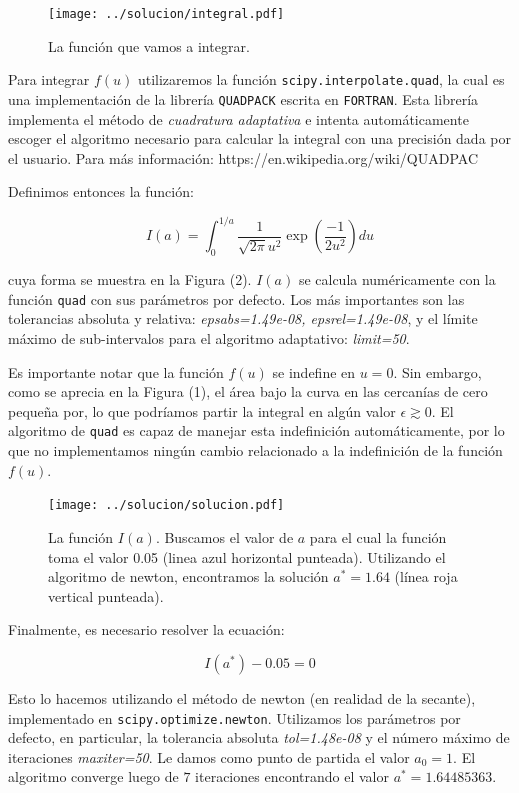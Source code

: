 \documentclass[letter, 11pt]{article}
\begin{document}
\begin{figure}[!ht]
  \centering
  \texttt{[image: ../solucion/integral.pdf]}
  \caption{La función que vamos a integrar.}
\end{figure}

Para integrar $f(u)$ utilizaremos la función \texttt{scipy.interpolate.quad},
la cual es una implementación de la librería \texttt{QUADPACK} escrita en
\texttt{FORTRAN}. Esta librería implementa el método de {\it cuadratura
adaptativa} e intenta automáticamente escoger el algoritmo necesario para
calcular la integral con una precisión dada por el usuario. Para más
información: https://en.wikipedia.org/wiki/QUADPAC

Definimos entonces la función:

\begin{equation}
  I(a) =  \int_0^{1/a} \frac{1}{\sqrt{2\pi}u^2} \exp\left({\frac{-1}{2u^2}}\right) du
\end{equation}

cuya forma se muestra en la Figura (2). $I(a)$ se calcula numéricamente con la
función \texttt{quad} con sus parámetros por defecto. Los más importantes son
las tolerancias absoluta y relativa: {\it epsabs=1.49e-08, epsrel=1.49e-08}, y
el límite máximo de sub-intervalos para el algoritmo adaptativo: {\it
limit=50}.

Es importante notar que la función $f(u)$ se indefine en $u=0$. Sin embargo,
como se aprecia en la Figura (1), el área bajo la curva en las cercanías de
cero pequeña por, lo que podríamos partir la integral en algún valor $\epsilon
\gtrsim 0$. El algoritmo de \texttt{quad} es capaz de manejar esta indefinición
automáticamente, por lo que no implementamos ningún cambio relacionado a la
indefinición de la función $f(u)$.

\begin{figure}[!hb]
  \centering
  \texttt{[image: ../solucion/solucion.pdf]}
  \caption{La función $I(a)$. Buscamos el valor de $a$ para el cual la función
  toma el valor 0.05 (linea azul horizontal punteada). Utilizando el algoritmo
de newton, encontramos la solución $a^*=1.64$ (línea roja vertical punteada).}
\end{figure}

Finalmente, es necesario resolver la ecuación:

\begin{equation}
  I(a^*) - 0.05 = 0
\end{equation}

Esto lo hacemos utilizando el método de newton (en realidad de la secante),
implementado en \texttt{scipy.optimize.newton}. Utilizamos los parámetros por
defecto, en particular, la tolerancia absoluta {\it tol=1.48e-08} y el número
máximo de iteraciones {\it maxiter=50}. Le damos como punto de partida el valor
$a_0=1$. El algoritmo converge luego de $7$ iteraciones encontrando el valor
$a^*= 1.64485363$.
\end{document}
